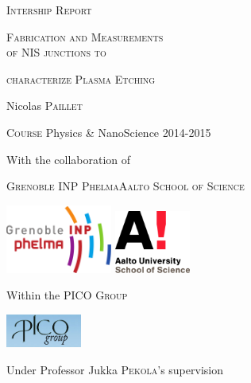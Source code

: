 \begin{titlepage}

    \begin{center}
        {\LARGE \textsc{Intership Report}}
        \vspace{0.4cm}
        
        {\huge \textsc{Fabrication and Measurements}\\        
        \textsc{of NIS junctions to}
        \vspace{0.3cm}
        
        \textsc{characterize Plasma Etching}}
        
        \vspace{1cm}
        
        {\LARGE Nicolas \textsc{Paillet}}\\
        \vspace{0.5cm}
        
        \textsc{Course} Physics \& NanoScience 2014-2015\\
        
        \vspace{1cm}
        
    With the collaboration of
    \vspace{0.7cm}
    
          \textsc{Grenoble INP Phelma}\hfill \textsc{Aalto School of Science}
         \vspace{1cm}
         
        \includegraphics[width=35mm]{logo_phelma.png}
        \hfill
        \includegraphics[width=25mm]{logo_aalto.png}
        
    \vspace{1cm}
    Within the PICO \textsc{Group}
    \vspace{0.5cm}
    
    \includegraphics[width=25mm]{logopico.png}
    \vspace{1cm}
    
    Under Professor Jukka \textsc{Pekola}'s supervision
       \end{center} 
\end{titlepage}
\setcounter{tocdepth}{1}
